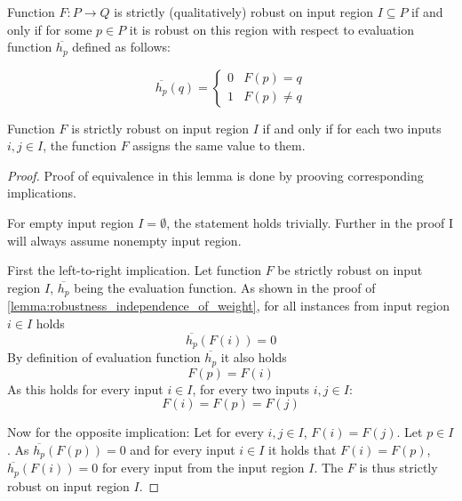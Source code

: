 \begin{definition}%
    \label{def:strict_robustness}
    Function $F: P\to Q$ is strictly (qualitatively) robust on input region $I\subseteq P$
    if and only if for some $p\in P$ it is robust on this region with respect
    to evaluation function $\overline{h_p}$ defined as follows:

    \begin{equation*}
        \overline{h_p}(q) = \left\{\begin{matrix}
            0 & F(p) = q\\
            1 & F(p) \neq q
        \end{matrix}\right.
    \end{equation*}
\end{definition}

\begin{lemma}{Function $F$ is strictly robust on input region $I$
    if and only if for each two inputs $i, j\in I$, the function $F$ assigns the same value to them.}
    \begin{proof}
        Proof of equivalence in this lemma is done
        by prooving corresponding implications.

        For empty input region $I=\emptyset$, the statement holds trivially.
        Further in the proof I will always assume nonempty input region.

        First the left-to-right implication.
        Let function $F$ be strictly robust on input region $I$,
        $\overline{h_p}$ being the evaluation function.
        As shown in the proof of \cref{lemma:robustness_independence_of_weight},
        for all instances from input region $i\in I$ holds
        \begin{equation*}
            \overline{h_p}(F(i)) = 0
        \end{equation*}
        By definition of evaluation function $\overline{h_p}$ it also holds
        \begin{equation*}
            F(p) = F(i)
        \end{equation*}
        As this holds for every input $i\in I$, for every two inputs $i, j\in I$:
        \begin{equation*}
            F(i) = F(p) = F(j)
        \end{equation*}

        Now for the opposite implication: Let for every $i, j\in I$, $F(i) = F(j)$.
        Let $p\in I$. As $\overline{h_p}(F(p)) = 0$
        and for every input $i\in I$ it holds that $F(i) = F(p)$,
        $\overline{h_p}(F(i)) = 0$ for every input from the input region $I$.
        The $F$ is thus strictly robust on input region $I$.
    \end{proof}
\end{lemma}

